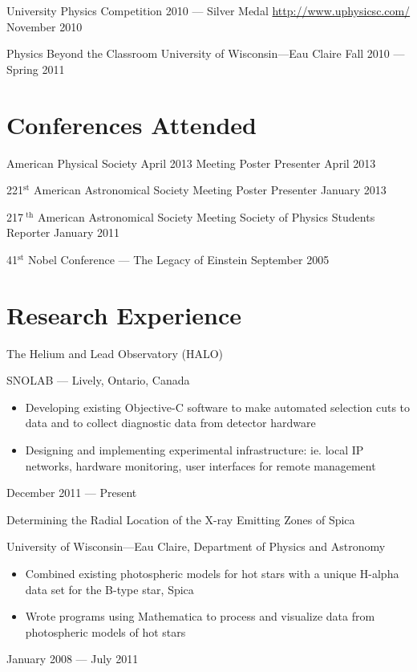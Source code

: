 \documentclass{cv}
\begin{document}
\begin{resume}
\object
{University Physics Competition 2010 --- Silver Medal}
{\rm \href{http://www.uphysicsc.com/}{http://www.uphysicsc.com/} }
{November 2010}


\object
{Physics Beyond the Classroom}
{University of Wisconsin---Eau Claire}
{Fall 2010 --- Spring 2011}



\section{Conferences Attended}



\object
{American Physical Society April 2013 Meeting}
{Poster Presenter}
{April 2013}


\object
{221$^\text{st}$ American Astronomical Society Meeting}
{Poster Presenter}
{January 2013}


\object
{217$^\text{ th}$ American Astronomical Society Meeting}
{Society of Physics Students Reporter}
{January 2011}


\object
{41$^\text{st}$ Nobel Conference --- The Legacy of Einstein}
{}
{September 2005}



\newpage

\section{Research Experience}



\object
{The Helium and Lead Observatory (HALO)}
{SNOLAB --- Lively, Ontario, Canada \noemph
	\begin{itemize}
		\item Developing existing Objective-C software to make automated selection cuts to data and to collect diagnostic data from detector hardware
		\item Designing and implementing experimental infrastructure: ie. local IP networks, hardware monitoring, user interfaces for remote management
	\end{itemize}
 }
{December 2011 --- Present}


\objectLarge
{Determining the Radial Location of the X-ray Emitting}
{Zones of Spica}
{University of Wisconsin---Eau Claire, Department of Physics and Astronomy \noemph
\begin{itemize}
		\item Combined existing photospheric models for hot stars with a unique H-alpha data set for the B-type star, Spica
		\item Wrote programs using Mathematica to process and visualize data from photospheric models of hot stars
	\end{itemize}
 }
{January 2008 --- July 2011}



\end{resume}
\end{document}
